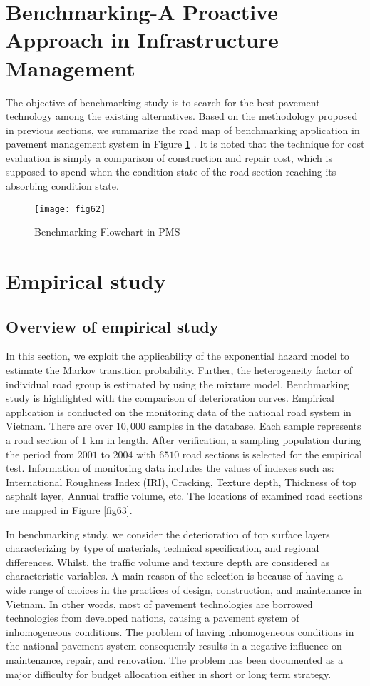 \section{Benchmarking-A Proactive Approach in Infrastructure Management}
\label{65}
The objective of benchmarking study is to search for the best pavement technology among the existing alternatives. Based on the methodology proposed in previous sections, we summarize the road map of benchmarking application in pavement management system in Figure \ref{fig62} . It is noted that the technique for cost evaluation is simply a comparison of construction and repair cost, which is supposed to spend when the condition state of the road section reaching its absorbing condition state. 
 
\begin{figure}[t]
\begin{center}
\texttt{[image: fig62]} 
\end{center}
\caption{Benchmarking Flowchart in PMS}
\label{fig62} 
\end{figure}
\section{Empirical study}
\label{66}
\subsection{Overview of empirical study}
\label{661}
In this section, we exploit the applicability of the exponential hazard model to estimate the Markov transition probability. Further, the heterogeneity factor of individual road group is estimated by using the mixture model. Benchmarking study is highlighted with the comparison of deterioration curves. Empirical application is conducted on the monitoring data of the national road system in Vietnam. There are over $10,000$ samples in the database. Each sample represents a road section of 1 km in length. After verification, a sampling population during the period from $2001$ to $2004$ with $6510$ road sections is selected for the empirical test. Information of monitoring data includes the values of indexes such as: International Roughness Index (IRI), Cracking, Texture depth, Thickness of top asphalt layer, Annual traffic volume, etc. The locations of examined road sections are mapped in Figure \ref{fig63}.

In benchmarking study, we consider the deterioration of top surface layers characterizing by type of materials, technical specification, and regional differences. Whilst, the traffic volume and texture depth are considered as characteristic variables. A main reason of the selection is because of having a wide range of choices in the practices of design, construction, and maintenance in Vietnam. In other words, most of pavement technologies are borrowed technologies from developed nations, causing a pavement system of inhomogeneous conditions. The problem of having inhomogeneous conditions in the national pavement system consequently results in a negative influence on maintenance, repair, and renovation. The problem has been documented as a major difficulty for budget allocation either in short or long term strategy.

